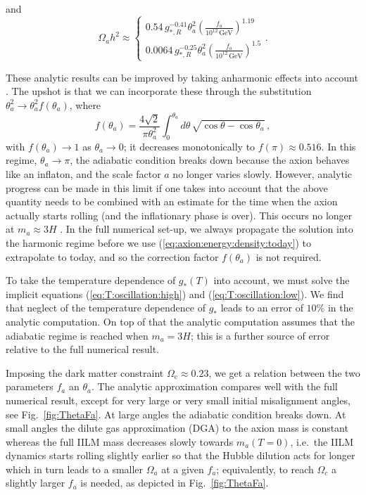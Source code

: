 \documentclass[preprint,nofootinbib]{revtex4}
\newcommand{\reffig}[1]{Fig.~\ref{#1}}
\newcommand{\units}[1]{\, \mathrm{#1}}
\begin{document}
and
\begin{equation}
 \Omega_a h^2 \approx \left\{
 \begin{array}{c}
  0.54\, g_{*,R}^{-0.41} \theta_a^2 \left(\frac{f_a}{10^{12}\units{GeV}}\right)^{1.19} \\
  0.0064\, g_{*,R}^{-0.25} \theta_a^2 \left(\frac{f_a}{10^{12}\units{GeV}}\right)^{1.5}
 \end{array}
 \right. .
\end{equation}

These analytic results can be improved by taking anharmonic effects into account \cite{bae:huh:kim:axion}. The upshot is that we can incorporate these through the substitution $\theta^2_a \to \theta^2_a f(\theta_a)$, where
\begin{equation}
 f(\theta_a) = \frac{4\sqrt{2}}{\pi\theta_a^2} \int_0^{\theta_a}d\theta\, \sqrt{\cos\theta-\cos\theta_a} \,,
\end{equation}
with $f(\theta_a) \to 1$ as $\theta_a \to 0$; it decreases monotonically to $f(\pi) \approx 0.516$. In this regime, $\theta_a \to \pi$, the adiabatic condition breaks down because the axion behaves like an inflaton, and the scale factor $a$ no longer varies slowly. However, analytic progress can be made in this limit if one takes into account that the above quantity needs to be combined with an estimate for the time when the axion actually starts rolling (and the inflationary phase is over). This occurs no longer at $m_a \approx 3H$ \cite{lyth:axion:inflation:fluctuations:1,strobl:weiler:axion:anharmonic,visinelli:gondolo:axion}. In the full numerical set-up, we always propagate the solution into the harmonic regime before we use (\ref{eq:axion:energy:density:today}) to extrapolate to today, and so the correction factor $f(\theta_a)$ is not required.

To take the temperature dependence of $g_*(T)$ into account, we must solve the implicit equations (\ref{eq:T:oscillation:high}) and (\ref{eq:T:oscillation:low}). We find that neglect of the temperature dependence of $g_*$ leads to an error of $10\%$ in the analytic computation. On top of that the analytic computation assumes that the adiabatic regime is reached when $m_a=3H$; this is a further source of error relative to the full numerical result.

Imposing the dark matter constraint $\Omega_\mathrm{c} \approx 0.23$, we get a relation between the two parameters $f_a$ an $\theta_a$. The analytic approximation compares well with the full numerical result, except for very large or very small initial misalignment angles, see \reffig{fig:ThetaFa}. At large angles the adiabatic condition breaks down. At small angles the dilute gas approximation (DGA) to the axion mass is constant whereas the full IILM mass decreases slowly towards $m_a(T=0)$, i.e.\ the IILM dynamics starts rolling slightly earlier so that the Hubble dilution acts for longer which in turn leads to a smaller $\Omega_a$ at a given $f_a$; equivalently, to reach $\Omega_c$ a slightly larger $f_a$ is needed, as depicted in \reffig{fig:ThetaFa}.
\end{document}
